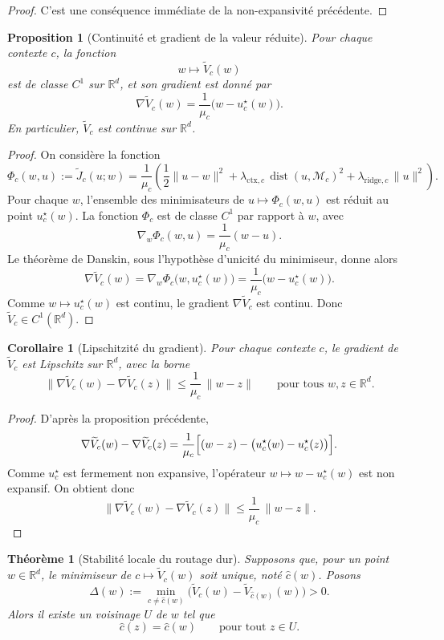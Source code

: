 \documentclass[11pt,a4paper]{article}
\newtheorem{proposition}{Proposition}[section]
\newtheorem{theorem}{Théorème}[section]
\newtheorem{corollary}{Corollaire}[section]
\DeclareMathOperator{\dist}{dist}
\newcommand{\R}{\mathbb R}
\newcommand{\Mcal}{\mathcal M}
\begin{document}
\begin{proof}
C'est une conséquence immédiate de la non-expansivité précédente.
\end{proof}

\begin{proposition}[Continuité et gradient de la valeur réduite]
Pour chaque contexte \(c\), la fonction
\[
w\longmapsto \widetilde V_c(w)
\]
est de classe \(C^1\) sur \(\R^d\), et son gradient est donné par
\[
\nabla \widetilde V_c(w)
=
\frac{1}{\mu_c}\bigl(w-u_c^\star(w)\bigr).
\]
En particulier, \(\widetilde V_c\) est continue sur \(\R^d\).
\end{proposition}

\begin{proof}
On considère la fonction
\[
\Phi_c(w,u):=\widetilde J_c(u;w)
=
\frac{1}{\mu_c}\left(
\frac12\|u-w\|^2
+
\lambda_{\mathrm{ctx},c}\,\dist(u,\Mcal_c)^2
+
\lambda_{\mathrm{ridge},c}\,\|u\|^2
\right).
\]
Pour chaque \(w\), l'ensemble des minimisateurs de \(u\mapsto \Phi_c(w,u)\) est réduit au point
\(u_c^\star(w)\). La fonction \(\Phi_c\) est de classe \(C^1\) par rapport à \(w\), avec
\[
\nabla_w \Phi_c(w,u)=\frac{1}{\mu_c}(w-u).
\]
Le théorème de Danskin, sous l'hypothèse d'unicité du minimiseur, donne alors
\[
\nabla \widetilde V_c(w)
=
\nabla_w \Phi_c\bigl(w,u_c^\star(w)\bigr)
=
\frac{1}{\mu_c}\bigl(w-u_c^\star(w)\bigr).
\]
Comme \(w\mapsto u_c^\star(w)\) est continu, le gradient \(\nabla \widetilde V_c\) est continu. Donc \(\widetilde V_c\in C^1(\R^d)\).
\end{proof}

\begin{corollary}[Lipschitzité du gradient]
Pour chaque contexte \(c\), le gradient de \(\widetilde V_c\) est Lipschitz sur \(\R^d\), avec la borne
\[
\|\nabla \widetilde V_c(w)-\nabla \widetilde V_c(z)\|
\le
\frac{1}{\mu_c}\,\|w-z\|
\qquad
\text{pour tous } w,z\in\R^d.
\]
\end{corollary}

\begin{proof}
D'après la proposition précédente,
\[
\nabla \widetilde V_c(w)-\nabla \widetilde V_c(z)
=
\frac{1}{\mu_c}\Bigl[(w-z)-\bigl(u_c^\star(w)-u_c^\star(z)\bigr)\Bigr].
\]
Comme \(u_c^\star\) est fermement non expansive, l'opérateur
\(w\mapsto w-u_c^\star(w)\) est non expansif. On obtient donc
\[
\|\nabla \widetilde V_c(w)-\nabla \widetilde V_c(z)\|
\le
\frac{1}{\mu_c}\,\|w-z\|.
\]
\end{proof}

\begin{theorem}[Stabilité locale du routage dur]
Supposons que, pour un point \(w\in\R^d\), le minimiseur de
\(c\mapsto \widetilde V_c(w)\) soit unique, noté \(\hat c(w)\). Posons
\[
\Delta(w):=
\min_{c\neq \hat c(w)}
\bigl(\widetilde V_c(w)-\widetilde V_{\hat c(w)}(w)\bigr)>0.
\]
Alors il existe un voisinage \(U\) de \(w\) tel que
\[
\hat c(z)=\hat c(w)
\qquad\text{pour tout } z\in U.
\]
\end{theorem}
\end{document}

